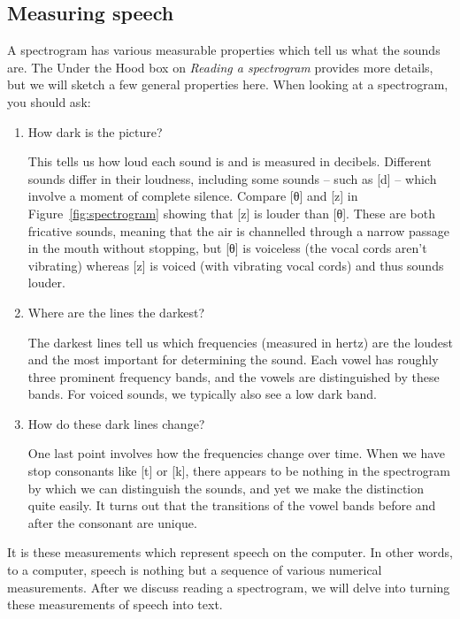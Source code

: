 \subsection{Measuring speech}

A spectrogram has various measurable properties which tell us what the
sounds are.  The Under the Hood box on \emph{Reading a
  spectrogram} provides more details, but we will sketch a few general
properties here.  When looking at
a spectrogram, you should ask:

\begin{enumerate}
\item How dark is the picture?
  
  This tells us how loud each sound is and is measured in decibels.
  Different sounds differ in their loudness, including some sounds --
  such as {[d]} -- which involve a moment of complete silence.
  Compare [θ] and {[z]} in
  Figure~\ref{fig:spectrogram} showing that {[z]} is louder than [θ].  These are both fricative sounds, meaning that the air is channelled through a narrow passage in the mouth without stopping, but [θ] is voiceless (the vocal cords aren't vibrating) whereas {[z]} is voiced (with vibrating vocal cords) and thus sounds louder.

  
\item Where are the lines the darkest?
  
  The darkest lines tell us which frequencies (measured in hertz) are
  the loudest and the most important for determining the sound.  Each
  vowel has roughly three prominent frequency bands, and the vowels
  are distinguished by these bands.  For voiced sounds, we typically
  also see a low dark band.

\item How do these dark lines change?
  
  One last point involves how the frequencies change over time.  When
  we have stop consonants like {[t]} or {[k]}, there
  appears to be nothing in the spectrogram by which we can distinguish
  the sounds, and yet we make
  the distinction quite easily.  It turns out that the transitions of
  the vowel bands before and after the consonant are unique.

\end{enumerate}
\largerpage
It is these measurements which represent speech on the computer.  In
other words, to a computer, speech is nothing but a sequence of
various numerical measurements.  
After we discuss reading a spectrogram, we will delve into turning
these measurements of speech into text.



